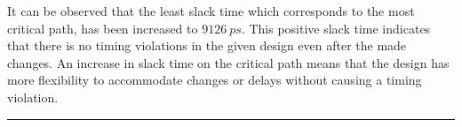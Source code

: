 \documentclass[a4paper,11pt]{article}%
\begin{document}
It can be observed that the least slack time which corresponds to the most critical path, has been increased to $9126~ps$. This positive slack time indicates that there is no timing violations in the given design even after the made changes. An increase in slack time on the critical path means that the design has more flexibility to accommodate changes or delays without causing a timing violation.

\vfill
\hrule




\end{document}
